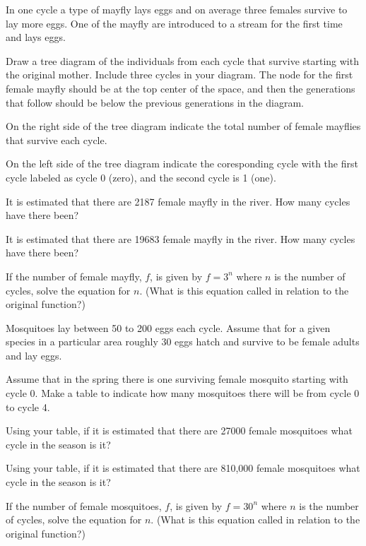 \begin{problem}
\clearpage

\item In one cycle a type of mayfly lays eggs and on average three
  females survive to lay more eggs. One of the mayfly are introduced
  to a stream for the first time and lays eggs.
  \begin{subproblem}
  \item Draw a tree diagram of the individuals from each cycle that
    survive starting with the original mother. Include three cycles in
    your diagram. The node for the first female mayfly should be at
    the top center of the space, and then the generations that follow
    should be below the previous generations in the diagram.  

    \vfill

  \item On the right side of the tree diagram indicate the total number
    of female mayflies that survive each cycle.
  \item On the left side of the tree diagram indicate the coresponding cycle with the
    first cycle labeled as cycle 0 (zero), and the second cycle is 1 (one).
  \item It is estimated that there are 2187 female mayfly in the river. How
    many cycles have there been?
    \vspace{3em}
  \item It is estimated that there are 19683 female mayfly in the river. How
    many cycles have there been?
    \vspace{3em}
  \item If the number of female mayfly, $f$, is given by $f=3^n$ where
    $n$ is the number of cycles, solve the equation for $n$. (What is
    this equation called in relation to the original function?)
    \vspace{3em}
  \end{subproblem}

\clearpage

\item Mosquitoes lay between 50 to 200 eggs each cycle. Assume that
  for a given species in a particular area roughly 30 eggs hatch and
  survive to be female adults and lay eggs.
  \begin{subproblem}
  \item Assume that in the spring there is one surviving female
    mosquito starting with cycle 0. Make a table to indicate how many
    mosquitoes there will be from cycle 0 to cycle 4.
    \vfill
  \item Using your table, if it is estimated that there are 27000 female
    mosquitoes what cycle in the season is it?
    \vfill
  \item Using your table, if it is estimated that there are 810,000 female
    mosquitoes what cycle in the season is it?
    \vfill
  \item If the number of female mosquitoes, $f$, is given by $f=30^n$ where
    $n$ is the number of cycles, solve the equation for $n$. (What is
    this equation called in relation to the original function?)
    \vspace{3em}
  \end{subproblem}


\end{problem}

